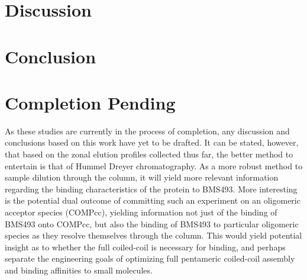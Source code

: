 \begin{refsection}
\section{Discussion}

\section{Conclusion}

\section{Completion Pending}

As these studies are currently in the process of completion, any discussion and
conclusions based on this work have yet to be drafted. It can be stated,
however, that based on the zonal elution profiles collected thus far, the better
method to entertain is that of Hummel Dreyer chromatography. As a more robust
method to sample dilution through the column, it will yield more relevant
information regarding the binding characteristics of the protein to BMS493. More
interesting is the potential dual outcome of committing such an experiment on an
oligomeric acceptor species (COMPcc), yielding information not just of the
binding of BMS493 onto COMPcc, but also the binding of BMS493 to particular
oligomeric species as they resolve themselves through the column. This would
yield potential insight as to whether the full coiled-coil is necessary for
binding, and perhaps separate the engineering goals of optimizing full
pentameric coiled-coil assembly and binding affinities to small molecules.


\printbibliography[heading=subbibliography]

\end{refsection}
